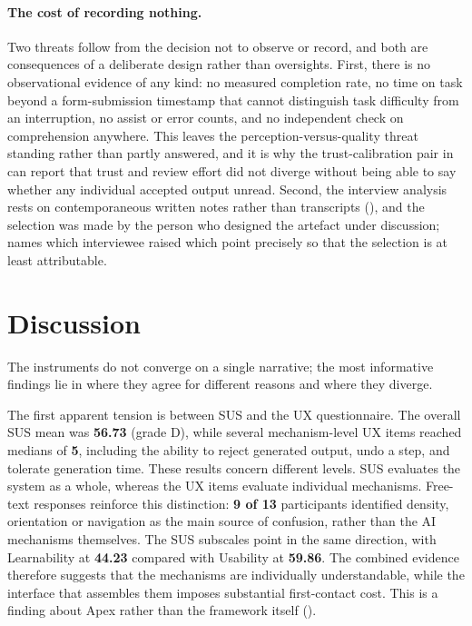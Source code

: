\paragraph{The cost of recording nothing.} Two threats follow from the decision not to observe or record, and both are consequences of a deliberate design rather than oversights. First, there is no observational evidence of any kind: no measured completion rate, no time on task beyond a form-submission timestamp that cannot distinguish task difficulty from an interruption, no assist or error counts, and no independent check on comprehension anywhere. This leaves the perception-versus-quality threat standing rather than partly answered, and it is why the trust-calibration pair in  can report that trust and review effort did not diverge without being able to say whether any individual accepted output unread. Second, the interview analysis rests on contemporaneous written notes rather than transcripts (), and the selection was made by the person who designed the artefact under discussion;  names which interviewee raised which point precisely so that the selection is at least attributable.

\section{Discussion}
\label{sec:eval_discussion}

The instruments do not converge on a single narrative; the most informative findings lie in where they agree for different reasons and where they diverge.

The first apparent tension is between \ac{SUS} and the \ac{UX} questionnaire. The overall \ac{SUS} mean was \textbf{56.73} (grade D), while several mechanism-level \ac{UX} items reached medians of \textbf{5}, including the ability to reject generated output, undo a step, and tolerate generation time. These results concern different levels. \ac{SUS} evaluates the system as a whole, whereas the \ac{UX} items evaluate individual mechanisms. Free-text responses reinforce this distinction: \textbf{9 of 13} participants identified density, orientation or navigation as the main source of confusion, rather than the AI mechanisms themselves. The \ac{SUS} subscales point in the same direction, with Learnability at \textbf{44.23} compared with Usability at \textbf{59.86}. The combined evidence therefore suggests that the mechanisms are individually understandable, while the interface that assembles them imposes substantial first-contact cost. This is a finding about Apex rather than the framework itself ().

